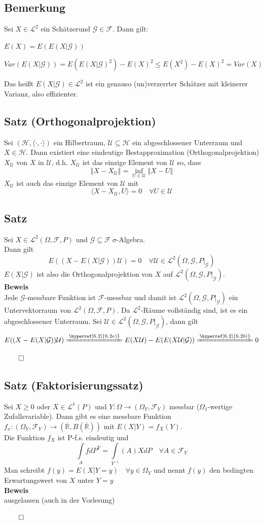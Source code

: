 \documentclass[german,10pt,oneside, fleqn, a4paper]{article}
\newcommand {\R}	{\mathbb{R}}
\newcommand{\ra}{\rightarrow}
\newcommand{\brc}[1]{\left(#1\right)}
\newcommand{\norm}[1]{\left\Vert #1 \right\Vert}
\newcommand{\QED}{\begin{flushright}$\qed$\end{flushright}}
\newcommand{\mc}[1]{\mathcal{#1}}
\newcommand{\lp}[1]{\mc{L}^{#1}}
\newcommand{\beweis}{\textbf{Beweis}\\}
\newcommand{\1}[1]{1_{#1}}
\newcommand{\2}[1]{\1{\brac{#1}}}
\newcommand{\raum}{\brc{\Omega,\mc{F},P}}
\newcommand{\g}{\mc{G}}
\newcommand{\f}{\mc{F}}
\newcommand{\h}{\mc{H}}
\newcommand{\qf}{\quad\forall}
\begin{document}
\subsection{Bemerkung}
\label{6.4}
Sei $X\in\lp{2}$ ein \glqq Schätzer\grqq und $\g\in\f$. Dann gilt:\begin{list}{•}{}
\item $E(X)=E(E(X|\g))$
\item $Var(E(X|\g))=E(E(X|\g)^2)-E(X)^2\leq E(X^2)-E(X)^2=Var(X)$
\end{list}
Das heißt $E(X|\g)\in\lp{2}$ ist ein genauso (un)verzerrter Schätzer mit kleinerer Varianz, also effizienter.

\subsection{Satz (Orthogonalprojektion)}
\label{6.5}
Sei $(\h,\langle\cdot,\cdot\rangle)$ ein Hilbertraum, $\mc{U}\subseteq \h$ ein abgeschlossener Unterraum und $X\in\h$. Dann existiert eine eindeutige Bestapproximation (Orthogonalprojektion) $X_\mc{U}$ von $X$ in $ \mc{U}$, d.h. $X_\mc{U}$ ist das einzige Element von $\mc{U}$ so, dass \[
\norm{X-X_\mc{U}}=\inf\limits_{U\in\mc{U}}\norm{X-U}\]
$X_\mc{U}$ ist auch das einzige Element von $\mc{U}$ mit \[
\langle X-X_\mc{U},U\rangle=0\quad\forall U\in\mc{U}\]

\subsection{Satz}
\label{6.6}
Sei $X\in\lp{2}\raum$ und $\g\subseteq\f\ \sigma$-Algebra.\\
Dann gilt\[
E((X-E(X|\g))\mc{U})=0\qf\mc{U}\in\lp{2}(\Omega,\g,P|_\g)\]
$E(X|\g)$ ist also die Orthogonalprojektion von $X$ auf $\lp{2}(\Omega,\g,P|_\g)$.\\
\beweis
Jede $\g$-messbare Funktion ist $\f$-messbar und damit ist $\lp{2}(\Omega,\g,P|_\g)$ ein Untervektorraum von $\lp{2}\raum$. Da $\lp{2}$-Räume vollständig sind, ist es ein abgeschlossener Unterraum. Sei $\mc{U}\in\lp{2}(\Omega,\g,P|_\g)$, dann gilt\[
E((X-E(X|\g))\mc{U})\xlongequal{\hyperref[6.2]{6.2 e)}}E(X\mc{U})-E(E(X\mc{U}|\g))\xlongequal{\hyperref[6.2]{6.2 b)}}0\]\QED

\subsection{Satz (Faktorisierungssatz)}
\label{6.7}
Sei $X\geq 0$ oder $X\in\lp{1}(P)$ und $Y:\Omega\ra(\Omega_Y,\f_Y)$ messbar ($\Omega_1$-wertige Zufallsvariable). Dann gibt es eine messbare Funktion $f_x:(\Omega_Y,\f_Y)\ra(\overline{\R},B(\overline{\R}))$ mit $E(X|Y)=f_X(Y)$.\\
Die Funktion $f_X$ ist P-f.s. eindeutig und \[
\int\limits_AfdP^Y=\int\limits_{Y^{-1}}(A)XdP\qf A\in\f_Y\]
Man schreibt $f(y)=E(X|Y=y)\qf y\in\Omega_Y$ und nennt $f(y)$ den bedingten Erwartungswert von $X$ unter $Y=y$\\
\beweis
ausgelassen (auch in der Vorlesung)\QED
\end{document}
